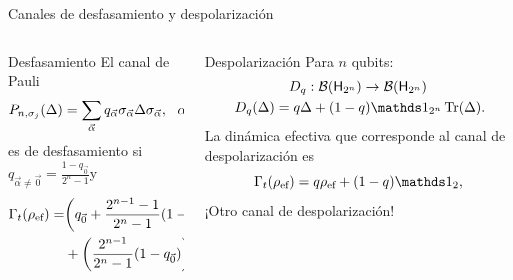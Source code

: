 \begin{frame}{Canales de desfasamiento y despolarización}
    \begin{columns}
        \begin{column}{0.5\textwidth}
            \begin{block}{Desfasamiento}
                El canal de Pauli
                \begin{equation}
                    P_{n,\sigma_{j}}(\Delta)=\sum_{\vec{\alpha}}q_{\vec{\alpha}}\sigma_{\vec{\alpha}}\Delta\sigma_{\vec{\alpha}}, \,\text{ }\, \alpha_{k}\in\{0,j\}\nonumber
                \end{equation}\pause
                es  de desfasamiento si $q_{\vec{\alpha}\neq\vec{0}}=\frac{1-q_{\vec{0} }}{2^{n}-1}$\pause y 
                \begin{align}
                    \Gamma_{t}(\rho_{\text{ef}})=&\qty(q_{\vec{0}}+\frac{2^{n-1}-1}{2^{n}-1}(1-q_{\vec{0}}))\rho_{\text{ef}}\nonumber\\
                    &+\qty(\frac{2^{n-1}}{2^{n}-1}(1-q_{\vec{0}}))\sigma_{j}\rho_{\text{ef}}\sigma_{j}.\nonumber
                \end{align}
            \end{block}
        \end{column}\pause
        \begin{column}{0.5\textwidth}
            \begin{block}{Despolarización}
                Para $n$ qubits:\pause
                \begin{equation}
                    \begin{gathered}
                    D_{q}:\mcB(\hilbert_{2^{n}}) \rightarrow \mcB(\hilbert_{2^{n}})\\
                    D_{q}(\Delta)=q\Delta+(1-q)\Id_{2^{n}}\Tr(\Delta)\rlap{.}
                \end{gathered}\nonumber
            \end{equation}\pause
                La dinámica efectiva que corresponde al canal de despolarización es\pause
                \begin{equation}
                    \Gamma_{t}(\rho_{\ef})=q\rho_{\ef}+(1-q)\Id_{2},\nonumber
                \end{equation}\pause
                ¡Otro canal de despolarización!
            \end{block}
        \end{column}
    \end{columns}
\end{frame}

